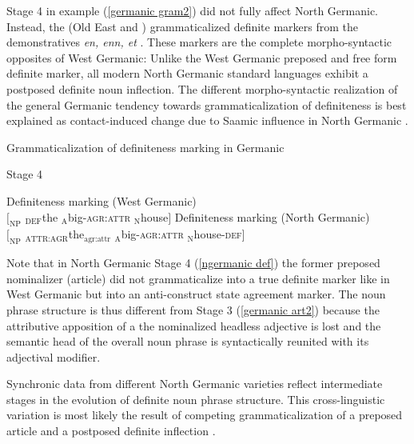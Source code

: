 {Stage 4 in example (\ref{germanic gram2}) did not fully affect North Germanic. Instead, the  (Old East and ) grammaticalized definite markers from the demonstratives \textit{en, enn, et} \citep[15]{heinrichs1954}. These markers are the complete morpho-syntactic opposites of West Germanic: Unlike the West Germanic preposed and free form definite marker, all modern North Germanic standard languages exhibit a postposed definite noun inflection. The different morpho-syntactic realization of the general Germanic tendency towards grammaticalization of definiteness is best explained as contact-induced change due to Saamic influence in North Germanic \citep{kusmenko2008}.
\begin{exe}
\label{germanic gram3}
\ex \rm{Grammaticalization of definiteness marking in Germanic}
\begin{xlist}
\ex \rm{Stage 4}
\begin{xlist}
\ex \rm{Definiteness marking (West Germanic)}\\
$[_{\text{NP}}$ $_{\text{DEF}}$the $_{\text{A}}$big-\textsc{agr:attr} $_{\text{N}}$house$]$
\ex \rm{Definiteness marking (North Germanic)}\\
$[_{\text{NP}}$ $_{\text{ATTR:AGR}}$the$_{\text{agr:attr}}$ $_{\text{A}}$big-\textsc{agr:attr} $_{\text{N}}$house-\textsc{def}$]$\label{ngermanic def}
\end{xlist}
\end{xlist}
\end{exe}
Note that in North Germanic Stage 4 (\ref{ngermanic def}) the former preposed nominalizer (article) did not grammaticalize into a true definite marker like in West Germanic but into an anti\hyp{}construct state agreement marker. The noun phrase structure is thus different from Stage 3 (\ref{germanic art2}) because the attributive apposition of a the nominalized headless adjective is lost and the semantic head of the overall noun phrase is syntactically reunited with its adjectival modifier.

Synchronic data from different North Germanic varieties reflect intermediate stages in the evolution of definite noun phrase structure. This cross-linguistic variation is most likely the result of competing grammaticalization of a preposed article and a postposed definite inflection \citep{dahl2003}. 

}
